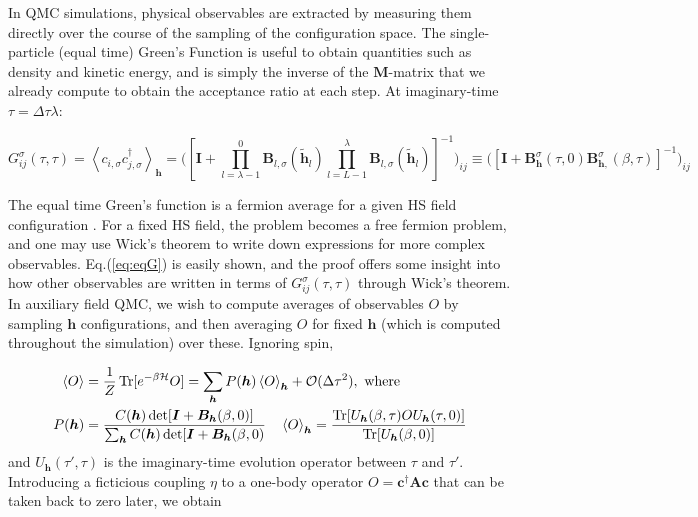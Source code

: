 In QMC simulations, physical observables are extracted by measuring them directly over the course of the sampling of the  configuration space. The single-particle (equal time) Green's Function is useful to obtain quantities such as density and kinetic energy, and is simply the inverse of the $\bm M$-matrix that we already compute to obtain the acceptance ratio at each step.
At imaginary-time $\tau = \Delta \tau \lambda$: 

\begin{equation}\label{eq:eqG}
G_{ij}^\sigma ( \tau, \tau) = \left\langle c_{i,\sigma} c_{j,\sigma}^\dagger \right\rangle_{\bm h} = \bigg( [\bm I + \prod_{l= \lambda - 1}^0 \bm B_{l,\sigma} ( \widetilde{\bm h}_l ) \prod_{l= L -1}^\lambda \bm B_{l,\sigma} ( \widetilde{\bm h}_l )  ]^{-1} \bigg)_{ij} \equiv \bigg( [\bm I + \bm B_{\bm h}^\sigma (\tau, 0) \bm B_{\bm h, }^\sigma (\beta, \tau)  ]^{-1} \bigg)_{ij}
\end{equation}

The equal time Green's function is a fermion average for a given HS field configuration \cite{santos_introduction_2003}.
For a fixed HS field, the problem becomes a free fermion problem, and one may use Wick's theorem to write down expressions for more complex observables.
Eq.(\ref{eq:eqG}) is easily shown, and the proof offers some insight into how other observables are written in terms of $G_{ij}^\sigma (\tau, \tau)$ through Wick's theorem.
In auxiliary field \ac{QMC}, we wish to compute averages of observables $O$ by sampling $\bm h$ configurations, and then averaging $O$ for fixed $\bm h$ (which is computed throughout the simulation) over these.
Ignoring spin,

\begin{equation}
\begin{split}
\left\langle O \right\rangle &= \frac{1}{Z} \operatorname{Tr} [ e^{-\beta \mathcal{H} } O ] = \sum_{\bm h} P (\bm h) \left\langle O \right\rangle_{\bm h} + \mathcal{O}(\Delta \tau^2 ) , \,\,
\text{where} \\
P ( \bm h ) &= \frac{C(\bm h) \det [ \bm I + \bm B_{\bm h} ( \beta, 0 ) ] }{\sum_{\bm h} C(\bm h) \det [ \bm I + \bm B_{\bm h} ( \beta, 0 )} \quad
\left\langle O \right\rangle_{\bm h} = \frac{\operatorname{Tr}[ U_{\bm h} (\beta, \tau) O U_{\bm h} (\tau, 0)]}{\operatorname{Tr} [ U_{\bm h} (\beta, 0) ] } \\
\end{split}
\end{equation}
and $U_{\bm h} ( \tau', \tau)$ is the imaginary-time evolution operator between $\tau$ and $\tau'$.
Introducing a ficticious coupling $\eta$ to a one-body operator $O = \bm c^\dagger \bm A \bm c$ that can be taken back to zero later, we obtain 

